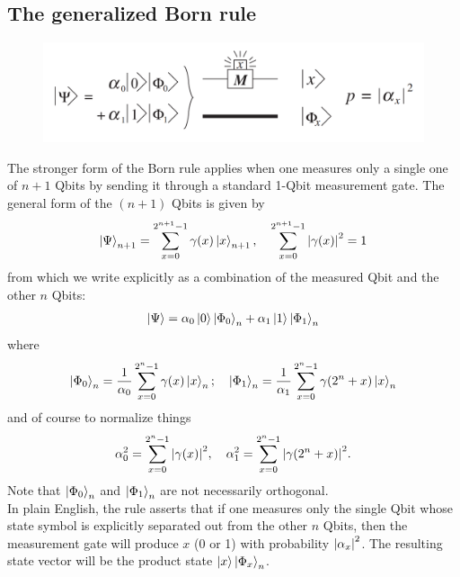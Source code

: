 \documentclass{book}
\theoremstyle{definition}
\newcommand{\f}[2]{\frac{#1}{#2}}
\begin{document}
\subsection{The generalized Born rule}

\begin{figure}[!htb]
	\centering
	\includegraphics[scale=0.25]{measurement}
\end{figure}

The stronger form of the Born rule applies when one measures only a single one of $n+1$ Qbits by sending it through a standard 1-Qbit measurement gate. The general form of the $(n+1)$ Qbits is given by
\begin{align}
\ket{\Psi}_{n+1} = \sum^{2^{n+1}-1}_{x=0}\gamma(x)\ket{x}_{n+1}, \quad \sum^{2^{n+1}-1}_{x=0}\abs{\gamma(x)}^2 = 1
\end{align}
from which we write explicitly as a combination of the measured Qbit and the other $n$ Qbits:
\begin{align}
\ket{\Psi} = \alpha_0\ket{0}\ket{\Phi_0}_n + \alpha_1 \ket{1}\ket{\Phi_1}_n
\end{align}
where
\begin{align}
\ket{\Phi_0}_n = \f{1}{\alpha_0}\sum^{2^{n}-1}_{x=0}\gamma(x)\ket{x}_n; \quad 
\ket{\Phi_1}_n = \f{1}{\alpha_1}\sum^{2^{n}-1}_{x=0}\gamma(2^n+x)\ket{x}_n
\end{align}
and of course to normalize things
\begin{align}
\alpha^2_0 = \sum^{2^n-1}_{x=0}\abs{\gamma(x)}^2, \quad \alpha^2_1 = \sum^{2^n-1}_{x=0}\abs{\gamma(2^n + x)}^2.
\end{align}
Note that $\ket{\Phi_0}_n$ and $\ket{\Phi_1}_n$ are not necessarily orthogonal.\\

In plain English, the rule asserts that if one measures only the single Qbit whose state symbol is explicitly separated out from the other $n$ Qbits, then the measurement gate will produce $x$ (0 or 1) with probability $\abs{\alpha_x}^2$. The resulting state vector will be the product state $\ket{x}\ket{\Phi_x}_n$. \\
\end{document}
